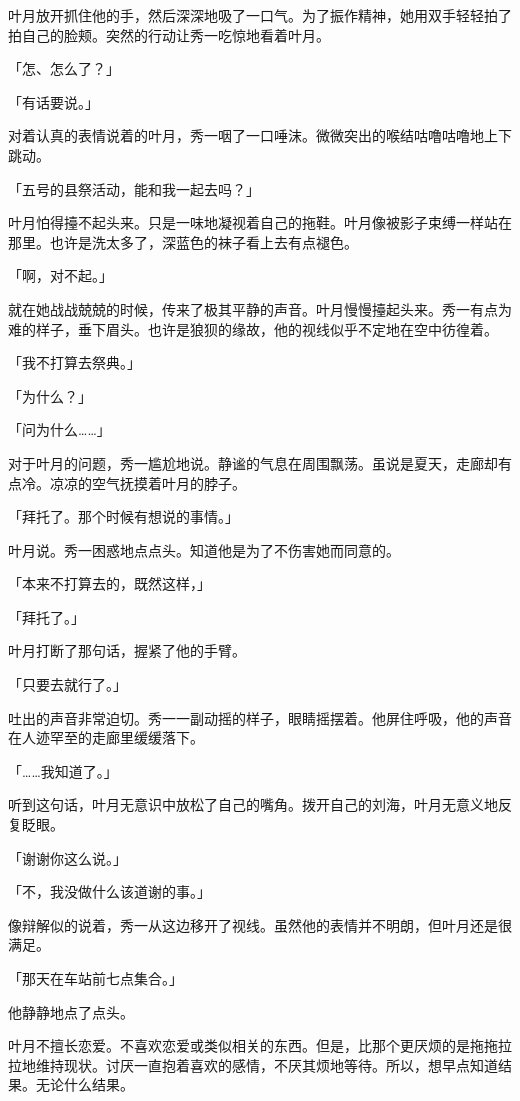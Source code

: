\documentclass[UTF8]{ctexart}
\begin{document}
    叶月放开抓住他的手，然后深深地吸了一口气。为了振作精神，她用双手轻轻拍了拍自己的脸颊。突然的行动让秀一吃惊地看着叶月。

    「怎、怎么了？」

    「有话要说。」

    对着认真的表情说着的叶月，秀一咽了一口唾沫。微微突出的喉结咕噜咕噜地上下跳动。

    「五号的县祭活动，能和我一起去吗？」

    叶月怕得擡不起头来。只是一味地凝视着自己的拖鞋。叶月像被影子束缚一样站在那里。也许是洗太多了，深蓝色的袜子看上去有点褪色。

    「啊，对不起。」

    就在她战战兢兢的时候，传来了极其平静的声音。叶月慢慢擡起头来。秀一有点为难的样子，垂下眉头。也许是狼狈的缘故，他的视线似乎不定地在空中彷徨着。

    「我不打算去祭典。」

    「为什么？」

    「问为什么……」

    对于叶月的问题，秀一尴尬地说。静谧的气息在周围飘荡。虽说是夏天，走廊却有点冷。凉凉的空气抚摸着叶月的脖子。

    「拜托了。那个时候有想说的事情。」

    叶月说。秀一困惑地点点头。知道他是为了不伤害她而同意的。

    「本来不打算去的，既然这样，」

    「拜托了。」

    叶月打断了那句话，握紧了他的手臂。

    「只要去就行了。」

    吐出的声音非常迫切。秀一一副动摇的样子，眼睛摇摆着。他屏住呼吸，他的声音在人迹罕至的走廊里缓缓落下。

    「……我知道了。」

    听到这句话，叶月无意识中放松了自己的嘴角。拨开自己的刘海，叶月无意义地反复眨眼。

    「谢谢你这么说。」

    「不，我没做什么该道谢的事。」

    像辩解似的说着，秀一从这边移开了视线。虽然他的表情并不明朗，但叶月还是很满足。

    「那天在车站前七点集合。」

    他静静地点了点头。

    叶月不擅长恋爱。不喜欢恋爱或类似相关的东西。但是，比那个更厌烦的是拖拖拉拉地维持现状。讨厌一直抱着喜欢的感情，不厌其烦地等待。所以，想早点知道结果。无论什么结果。
\end{document}
